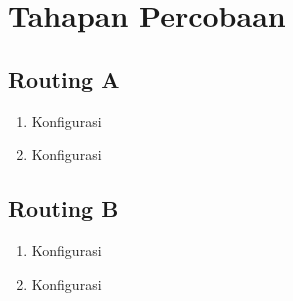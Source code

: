 \section*{Tahapan Percobaan} %

\subsection*{Routing A}

\begin{enumerate}
  \item Konfigurasi
  \item Konfigurasi
\end{enumerate}

\subsection*{Routing B}

\begin{enumerate}
  \item Konfigurasi
  \item Konfigurasi
\end{enumerate}
